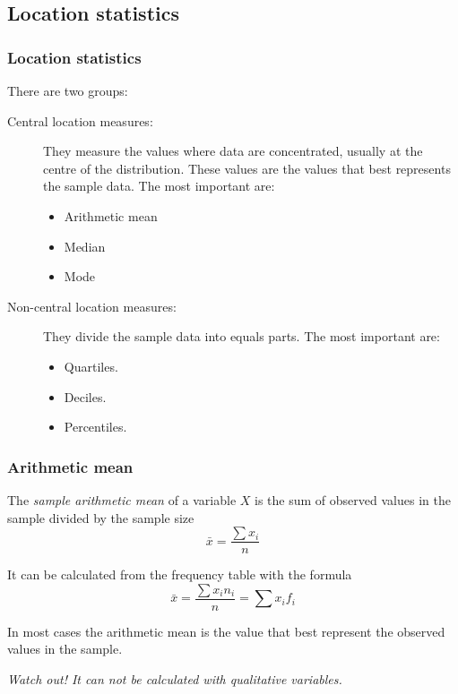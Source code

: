 \subsection{Location statistics}

\begin{frame}
\frametitle{Location statistics}
There are two groups: 

\begin{description}
\item [Central location measures:] They measure the values where data are concentrated, usually at the
centre of the distribution. 
These values are the values that best represents the sample data. 
The most important are:
\begin{itemize}
\item Arithmetic mean
\item Median
\item Mode
\end{itemize}
\item [Non-central location measures:] They divide the sample data into equals parts. 
The most important are:
\begin{itemize}
\item Quartiles.
\item Deciles.
\item Percentiles. 
\end{itemize}
\end{description}
\end{frame}


\begin{frame}
\frametitle{Arithmetic mean}
\begin{definition}
The \emph{sample arithmetic mean} of a variable $X$ is the sum of observed values in the sample divided by the sample
size
\[
\bar{x} = \frac{\sum x_i}{n}
\]
\end{definition}
It can be calculated from the frequency table with the formula
\[
\bar{x} = \frac{\sum x_in_i}{n} = \sum x_i f_i
\]

In most cases the arithmetic mean is the value that best represent the observed values in the sample. 
\begin{center}
\alert{\emph{Watch out! It can not be calculated with qualitative variables.}}
\end{center}
\end{frame}



